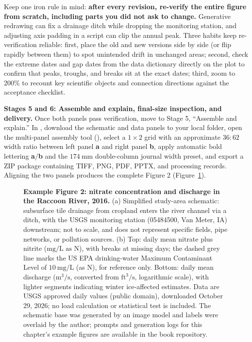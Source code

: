 Keep one iron rule in mind: \textbf{after every revision, re-verify the entire figure from scratch, including parts you did not ask to change.} Generative redrawing can fix a drainage ditch while dropping the monitoring station, and adjusting axis padding in a script can clip the annual peak. Three habits keep re-verification reliable: first, place the old and new versions side by side (or flip rapidly between them) to spot unintended drift in unchanged areas; second, check the extreme dates and gap dates from the data dictionary directly on the plot to confirm that peaks, troughs, and breaks sit at the exact dates; third, zoom to 200\% to recount key scientific objects and connection directions against the acceptance checklist.

\textbf{Stages 5 and 6: Assemble and explain, final-size inspection, and delivery.} Once both panels pass verification, move to Stage 5, ``Assemble and explain.'' In \scidraw{}, download the schematic and data panels to your local folder, open the multi-panel assembly tool (), select a $1 \times 2$ grid with an approximate $36:62$ width ratio between left panel \textbf{a} and right panel \textbf{b}, apply automatic bold lettering \textbf{a}/\textbf{b} and the $174\ \text{mm}$ double-column journal width preset, and export a ZIP package containing TIFF, PNG, PDF, PPTX, and processing records. Aligning the two panels produces the complete Figure 2 (Figure~\ref{fig:ch01-07}).

\begin{figure}[htbp]\centering
{\makeatletter{}\makeatother}
\caption{\textbf{Example Figure 2: nitrate concentration and discharge in the Raccoon River, 2016.} (a) Simplified study-area schematic: subsurface tile drainage from cropland enters the river channel via a ditch, with the USGS monitoring station (05484500, Van Meter, IA) downstream; not to scale, and does not represent specific fields, pipe networks, or pollution sources. (b) Top: daily mean nitrate plus nitrite ($\text{mg/L as N}$), with breaks at missing days; the dashed grey line marks the US EPA drinking-water Maximum Contaminant Level of $10\ \text{mg/L}$ (as N), for reference only. Bottom: daily mean discharge ($\text{m}^3/\text{s}$, converted from $\text{ft}^3/\text{s}$, logarithmic scale), with lighter segments indicating winter ice-affected estimates. Data are USGS approved daily values (public domain), downloaded October 29, 2026; no load calculation or statistical test is included. The schematic base was generated by an image model and labels were overlaid by the author; prompts and generation logs for this chapter's example figures are available in the book repository.}\label{fig:ch01-07}
\end{figure}

